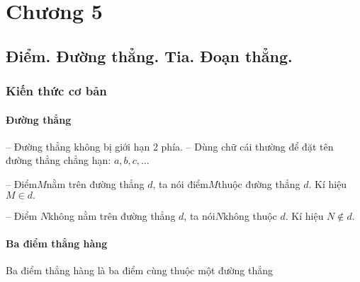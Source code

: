 \chapter{Chương 5}
\section{Điểm. Đường thẳng. Tia. Đoạn thẳng.}
\subsection{Kiến thức cơ bản}
\subsubsection{Đường thẳng}
-- Đường thẳng không bị giới hạn 2 phía.
-- Dùng chữ cái thường để đặt tên đường thẳng chẳng hạn: $a,b,c,\ldots$
\begin{center}
	\begin{tikzpicture}
		
	\end{tikzpicture}
\end{center}
-- Điểm$M$nằm trên đường thẳng $d$, ta nói điểm$M$thuộc đường thẳng $d$. Kí hiệu $M\in d.$
\begin{center}
	\begin{tikzpicture}
		
	\end{tikzpicture}
\end{center}
-- Điểm $N$không nằm trên đường thẳng $d$, ta nói$N$không thuộc $d$. Kí hiệu $N\notin d.$
\subsubsection{Ba điểm thẳng hàng}
Ba điểm thẳng hàng là ba điểm cùng thuộc một đường thẳng 
\begin{center}
	\begin{tikzpicture}
		
	\end{tikzpicture}
\end{center}
